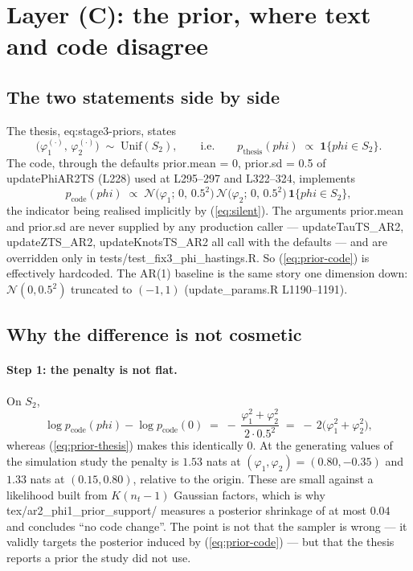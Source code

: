 \documentclass[11pt]{article}
\newcommand{\bphi}{\boldsymbol{\varphi}}
\newcommand{\ind}{\mathbf{1}}
\newcommand{\Norm}{\mathcal{N}}
\newcommand{\Unif}{\mathrm{Unif}}
\DeclareRobustCommand{\code}[1]{\texttt{#1}}
\newcommand{\eref}[1]{(\ref{#1})}
\def\bphi{phi}%
\def\boldsymbol#1{#1}%
\def\bm#1{#1}%
\def\code#1{#1}%
\theoremstyle{plain}
\theoremstyle{definition}
\theoremstyle{remark}
\begin{document}
\section{Layer (C): the prior, where text and code disagree}
\label{sec:layerC}

\subsection{The two statements side by side}

The thesis, \code{eq:stage3-priors}, states
\begin{equation}\label{eq:prior-thesis}
  \bigl(\varphi^{(\cdot)}_1,\, \varphi^{(\cdot)}_2\bigr)
  \;\sim\; \Unif(S_2),
  \qquad\text{i.e.}\qquad
  p_{\text{thesis}}(\bphi) \;\propto\; \ind\{\bphi \in S_2\}.
\end{equation}
The code, through the defaults \code{prior.mean = 0}, \code{prior.sd = 0.5} of
\code{updatePhiAR2TS} (L228) used at L295--297 and L322--324, implements
\begin{equation}\label{eq:prior-code}
  p_{\text{code}}(\bphi)
  \;\propto\;
  \Norm\bigl(\varphi_1;\, 0,\, 0.5^2\bigr)\,
  \Norm\bigl(\varphi_2;\, 0,\, 0.5^2\bigr)\,
  \ind\{\bphi \in S_2\},
\end{equation}
the indicator being realised implicitly by \eref{eq:silent}. The arguments
\code{prior.mean} and \code{prior.sd} are never supplied by any production
caller --- \code{updateTauTS\_AR2}, \code{updateZTS\_AR2},
\code{updateKnotsTS\_AR2} all call with the defaults --- and are overridden
only in \code{tests/test\_fix3\_phi\_hastings.R}. So \eref{eq:prior-code} is
effectively hardcoded. The AR(1) baseline is the same story one dimension
down: $\Norm(0, 0.5^2)$ truncated to $(-1,1)$
(\code{update\_params.R} L1190--1191).

\subsection{Why the difference is not cosmetic}

\paragraph{Step 1: the penalty is not flat.}
On $S_2$,
\begin{equation}\label{eq:log-penalty}
  \log p_{\text{code}}(\bphi) - \log p_{\text{code}}(\bm{0})
  \;=\; -\,\frac{\varphi_1^2 + \varphi_2^2}{2 \cdot 0.5^2}
  \;=\; -\,2\bigl(\varphi_1^2 + \varphi_2^2\bigr),
\end{equation}
whereas \eref{eq:prior-thesis} makes this identically $0$. At the generating
values of the simulation study the penalty is $1.53$ nats at
$(\varphi_1,\varphi_2) = (0.80,-0.35)$ and $1.33$ nats at $(0.15, 0.80)$,
relative to the origin. These are small against a likelihood built from
$K(n_t - 1)$ Gaussian factors, which is why
\code{tex/ar2\_phi1\_prior\_support/} measures a posterior shrinkage of at
most $0.04$ and concludes ``no code change''. The point is not that the
sampler is wrong --- it validly targets the posterior induced by
\eref{eq:prior-code} --- but that the thesis reports a prior the study did
not use.
\end{document}
